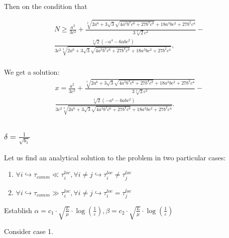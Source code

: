 \documentclass{article}
\begin{document}
Then on the condition that 

\begin{gather*}
    N \geq \frac{a^2}{3 c^2}+\frac{\sqrt[3]{2 a^6+3 \sqrt{3} \sqrt{4 a^3 b^3 c^6+27 b^4 c^8}+18 a^3 b c^2+27 b^2 c^4}}{3 \sqrt[3]{2} c^2}-  \\
    \frac{\sqrt[3]{2}\left(-a^4-6 a b c^2\right) } 
    {3 c^2 \sqrt[3]{2 a^6+3 \sqrt{3} \sqrt{4 a^3 b^3 c^6+27 b^4 c^8}+18 a^3 b c^2+27 b^2 c^4}}, \\
\end{gather*}

We get a solution: \\

\begin{gather*}
     x=\frac{a^2}{3 c^2}+\frac{\sqrt[3]{2 a^6+3 \sqrt{3} \sqrt{4 a^3 b^3 c^6+27 b^4 c^8}+18 a^3 b c^2+27 b^2 c^4}}{3 \sqrt[3]{2} c^2}- \\ \frac{\sqrt[3]{2}\left(-a^4-6 a b c^2\right)} 
    {3 c^2 \sqrt[3]{2 a^6+3 \sqrt{3} \sqrt{4 a^3 b^3 c^6+27 b^4 c^8}+18 a^3 b c^2+27 b^2 c^4}}.  \\
\end{gather*}

\subsubsection{$\delta = \frac{1}{\sqrt{b_1}}$}\label{eq:3.4.2}
Let us find an analytical solution to the problem in two particular cases:
\begin{enumerate}
    \item $\forall i\hookrightarrow \tau_{comm} \ll \tau_i^{loc}, \forall i\neq j\hookrightarrow \tau_i^{loc}\neq \tau_j^{loc}$
    \item $\forall i\hookrightarrow \tau_{comm} \gg \tau_i^{loc}, \forall i\neq j\hookrightarrow \tau_i^{loc} = \tau_j^{loc}$
\end{enumerate}

Establish $\alpha = c_1\cdot\sqrt{\frac{L}{\mu}}\cdot \log(\frac{1}{\varepsilon}),\beta = c_2\cdot\sqrt{\frac{L}{\mu}}\cdot \log(\frac{1}{\varepsilon}) $

Consider case 1.
\end{document}
